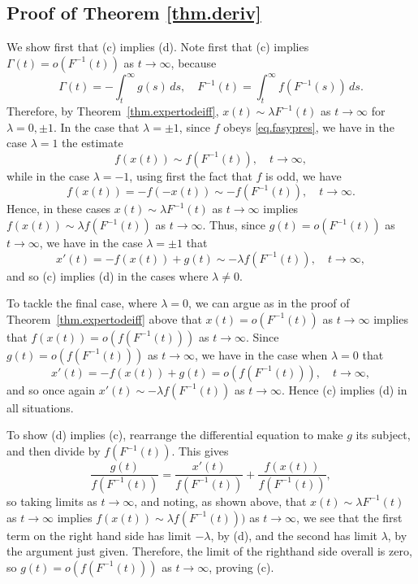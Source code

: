 \documentclass[a4paper,10pt,reqno]{amsart}
\numberwithin{equation}{section}
\theoremstyle{definition}
\theoremstyle{remark}
\DeclareMathOperator{\1}{\mathbbm 1}
\begin{document}
	\subsection{Proof of Theorem \ref{thm.deriv}}
	We show first that (c) implies (d). Note first that (c) implies $\Gamma(t)=o(F^{-1}(t))$ as $t\to\infty$, because
	\[
	\Gamma(t)=-\int_t^\infty g(s)\,ds, \quad F^{-1}(t)=\int_t^\infty f(F^{-1}(s))\,ds.
	\] 
	Therefore, by Theorem~\ref{thm.expertodeiff}, $x(t)\sim \lambda F^{-1}(t)$ as $t\to\infty$ for $\lambda=0, \pm1$. In the case that $\lambda=\pm 1$, since $f$ obeys \eqref{eq.fasypres}, we have in the case $\lambda=1$ the estimate 
	\[
	f(x(t))\sim f(F^{-1}(t)), \quad t\to\infty,
	\]
	while in the case $\lambda=-1$, using first the fact that $f$ is odd, we have 
	\[
	f(x(t))=-f(-x(t))\sim -f(F^{-1}(t)), \quad t\to\infty.
	\]
	Hence, in these cases $x(t)\sim \lambda F^{-1}(t)$ as $t\to\infty$ implies $f(x(t))\sim \lambda f(F^{-1}(t))$ as $t\to\infty$. Thus, since $g(t)=o(F^{-1}(t))$ as $t\to\infty$, we have in the case $\lambda=\pm1$ that 
	\[
	x'(t)=-f(x(t))+g(t)\sim -\lambda f(F^{-1}(t)), \quad t\to\infty,
	\]
	and so (c) implies (d) in the cases where $\lambda\neq 0$. 
	
	To tackle the final case, where $\lambda=0$, we can argue as in the proof of Theorem~\ref{thm.expertodeiff} above that $x(t)=o(F^{-1}(t))$ as $t\to\infty$ implies that $f(x(t))=o(f(F^{-1}(t)))$ as $t\to\infty$. 
	Since $g(t)=o(f(F^{-1}(t)))$ as $t\to\infty$, we have in the case when $\lambda=0$ that 
	\[
	x'(t)=-f(x(t))+g(t)= o(f(F^{-1}(t))), \quad t\to\infty,
	\]
	and so once again $x'(t)\sim -\lambda f(F^{-1}(t))$ as $t\to\infty$. Hence (c) implies (d) in all situations. 
	
	To show (d) implies (c), rearrange the differential equation to make  $g$ its subject, and then divide by $f(F^{-1}(t))$. This gives 
	\[
	\frac{g(t)}{f(F^{-1}(t))} = \frac{x'(t)}{f(F^{-1}(t))}+\frac{f(x(t))}{f(F^{-1}(t))},
	\]  
	so taking limits as $t\to\infty$, and noting, as shown above, that 
	$x(t)\sim \lambda F^{-1}(t)$ as $t\to\infty$ implies $f(x(t))\sim \lambda f(F^{-1}(t)))$ as $t\to\infty$, we see that the first term on the right hand side has limit $-\lambda$, by (d), and the second has limit $\lambda$, by the argument just given. Therefore, the limit of the righthand side overall is zero, so $g(t)=o(f(F^{-1}(t)))$ as $t\to\infty$, proving (c).
	
\end{document}
